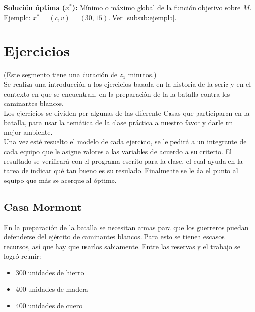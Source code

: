 \documentclass[a4paper,10pt,twocolumn]{article}
\theoremstyle{theorem}
\theoremstyle{definition}
\theoremstyle{remark}
\begin{document}
\textbf{Solución óptima ($x^*$):} Mínimo o máximo global de la función objetivo sobre $M$. Ejemplo: $x^* = (c, v) = (30, 15)$. Ver \ref{subsub:ejemplo}.

\section{Ejercicios}\label{sec:ejer}
(Este segmento tiene una duración de $z_1$ minutos.)\\

Se realiza una introducción a los ejercicios basada en la historia de la serie y en el contexto en que se encuentran, en la preparación de la la batalla contra los caminantes blancos.\\

Los ejercicios se dividen por algunas de las diferente Casas que participaron en la batalla, para usar la temática de la clase práctica a nuestro favor y darle un mejor ambiente.\\

Una vez esté resuelto el modelo de cada ejercicio, se le pedirá a un integrante de cada equipo que le asigne valores a las variables de acuerdo a su criterio. El resultado se verificará con el programa escrito para la clase, el cual ayuda en la tarea de indicar qué tan bueno es su resulado. Finalmente se le da el punto al equipo que más se acerque al óptimo.

	\subsection{Casa Mormont}\label{subsec:ejer_1}

En la preparación de la batalla se necesitan armas para que los guerreros puedan defenderse del ejército de caminantes blancos. Para esto se tienen escasos recursos, así que hay que usarlos sabiamente. Entre las reservas y el trabajo se logró reunir:

\begin{itemize}

	\item 300 unidades de hierro
	\item 400 unidades de madera
	\item 400 unidades de cuero

\end{itemize}
\end{document}
